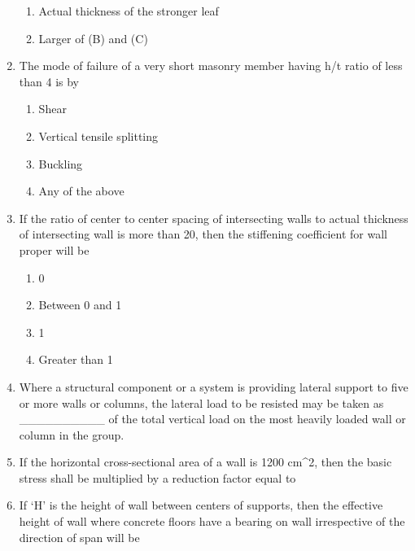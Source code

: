 \documentclass[11pt,a4paper]{article}
\begin{document}
\begin{enumerate}
\begin{enumerate}[label=\Alph*.]
\item{Actual thickness of the stronger leaf}
\item{Larger of (B) and (C)}
\end{enumerate}
\item{The mode of failure of a very short masonry member having h/t ratio of less than 4 is by}
\begin{enumerate}[label=\Alph*.]
\item{Shear}
\item{Vertical tensile splitting}
\item{Buckling}
\item{Any of the above}
\end{enumerate}
\item{If the ratio of center to center spacing of intersecting walls to actual thickness of intersecting wall is more than 20, then the stiffening coefficient for wall proper will be}
\begin{enumerate}[label=\Alph*.]
\item{0}
\item{Between 0 and 1}
\item{1}
\item{Greater than 1}
\end{enumerate}
\item{Where a structural component or a system is providing lateral support to five or more walls or columns, the lateral load to be resisted may be taken as \_\_\_\_\_\_\_\_\_\_ of the total vertical load on the most heavily loaded wall or column in the group.}
\\
\item{If the horizontal cross-sectional area of a wall is 1200 cm\^{}2, then the basic stress shall be multiplied by a reduction factor equal to
}
\\
\item{If `H' is the height of wall between centers of supports, then the effective height of wall where concrete floors have a bearing on wall irrespective of the direction of span will be
}
\end{enumerate}
\end{document}
